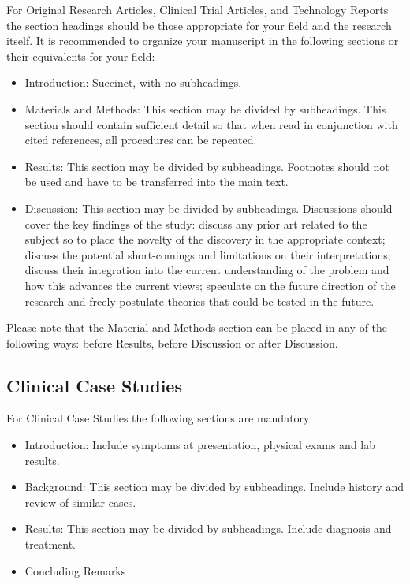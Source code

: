 \documentclass{frontiersSCNS} %
\begin{document}
For Original Research Articles, Clinical Trial Articles, and Technology Reports the section headings should be those appropriate for your field and the research itself. It is recommended to organize your manuscript in the following sections or their equivalents for your field:

\begin{itemize}
\item Introduction: Succinct, with no subheadings.
\item Materials and Methods: This section may be divided by subheadings. This section should contain sufficient detail so that when read in conjunction with cited references, all procedures can be repeated.
\item Results: This section may be divided by subheadings. Footnotes should not be used and have to be transferred into the main text.
\item Discussion: This section may be divided by subheadings. Discussions should cover the key findings of the study: discuss any prior art related to the subject so to place the novelty of the discovery in the appropriate context; discuss the potential short-comings and limitations on their interpretations; discuss their integration into the current understanding of the problem and how this advances the current views; speculate on the future direction of the research and freely postulate theories that could be tested in the future.
\end{itemize}

Please note that the Material and Methods section can be placed in any of the following ways: before Results, before Discussion or after Discussion.

\subsection{Clinical Case Studies}

For Clinical Case Studies the following sections are mandatory:

\begin{itemize}
\item Introduction: Include symptoms at presentation, physical exams and lab results.
\item Background: This section may be divided by subheadings. Include history and review of similar cases.
\item Results: This section may be divided by subheadings. Include diagnosis and treatment.
\item Concluding Remarks
\end{itemize}
\end{document}
